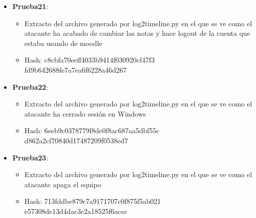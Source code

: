 \begin{itemize}
{\begin{itemize}
    \end{itemize}}
  \item{\textbf{Prueba21}: 
    \begin{itemize}
      \item{Extracto del archivo generado por log2timeline.py en el que se ve como el atacante ha acabado de cambiar las notas y hace logout de la cuenta que estaba usando de moodle}
      \item{Hash}: c8cbfa70eeff4033b9414f030920cf47f3\\fd9b642688fe7a7ea6f6228a46d267
    \end{itemize}}
  \item{\textbf{Prueba22}: 
    \begin{itemize}
      \item{Extracto del archivo generado por log2timeline.py en el que se ve como el atacante ha cerrado sesión en Windows}
      \item{Hash}: 6eeb9c0378779f8de0f8ac687aa5dbf55c\\d862a2cf70840d17487209f0538ed7
    \end{itemize}}
  \item{\textbf{Prueba23}: 
    \begin{itemize}
      \item{Extracto del archivo generado por log2timeline.py en el que se ve como el atacante apaga el equipo}
      \item{Hash}: 713fddbe879c7a9171707c0f875f5ab021\\e57308de13d4dac3c2a18525f6acec
    \end{itemize}}

\end{itemize}

